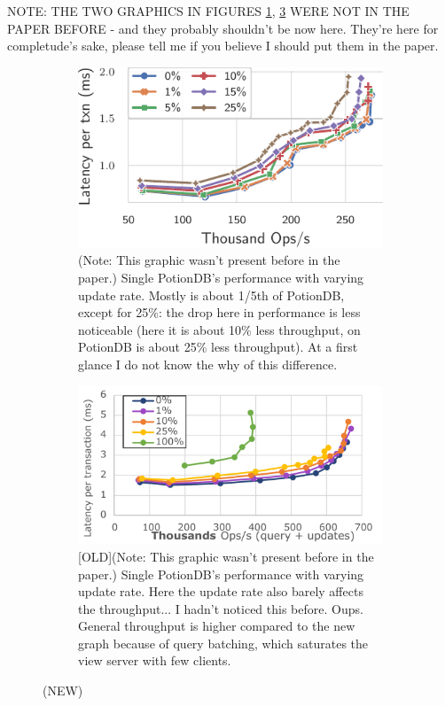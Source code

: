 \documentclass[sigplan,10pt]{acmart}
\begin{document}
NOTE: THE TWO GRAPHICS IN FIGURES \ref{fig:(new)update_rates_single_tc}, \ref{fig:(old)update_rates_single_tc} WERE NOT IN THE PAPER BEFORE - and they probably shouldn't be now here. They're here for completude's sake, please tell me if you believe I should put them in the paper.

\begin{figure}[h]
	\centering
	\begin{subfigure}{.47\linewidth}
		\includegraphics[width=1\linewidth]{singleQuery/upd_rate_single_tc}
		\caption{(Note: This graphic wasn't present before in the paper.) Single PotionDB's performance with varying update rate. Mostly is about 1/5th of PotionDB, except for 25\%: the drop here in performance is less noticeable (here it is about 10\% less throughput, on PotionDB is about 25\% less throughput). At a first glance I do not know the why of this difference.}
		\label{fig:(new)update_rates_single_tc}
	\end{subfigure}%
	\hspace*{3em}
	\begin{subfigure}{.47\linewidth}
		\includegraphics[width=1\linewidth]{upd_rate_tc_single}
		\caption{[OLD](Note: This graphic wasn't present before in the paper.) Single PotionDB's performance with varying update rate. Here the update rate also barely affects the throughput... I hadn't noticed this before. Oups. General throughput is higher compared to the new graph because of query batching, which saturates the view server with few clients.}
		\label{fig:(old)update_rates_single_tc}
	\end{subfigure}
	\caption{(NEW)}
\end{figure}
\end{document}
